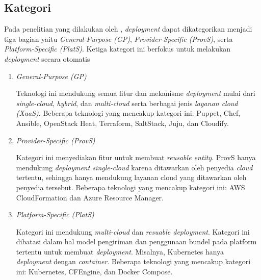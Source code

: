 \subsection{Kategori}
Pada penelitian yang dilakukan oleh \parencite{wurster2020essential}, \textit{deployment} dapat dikategorikan menjadi tiga bagian yaitu \textit{General-Purpose (GP)}, \textit{Provider-Specific (ProvS)}, serta \textit{Platform-Specific (PlatS)}. Ketiga kategori ini berfokus untuk melakukan \textit{deployment} secara otomatis

\begin{enumerate}
  \item \textit{General-Purpose (GP)}

        Teknologi ini mendukung semua fitur dan mekanisme \textit{deployment} mulai dari \textit{single-cloud}, \textit{hybrid}, dan \textit{multi-cloud} serta berbagai jenis \textit{layanan cloud (XaaS)}. Beberapa teknologi yang mencakup kategori ini: Puppet, Chef, Ansible, OpenStack Heat, Terraform, SaltStack, Juju, dan Cloudify.

  \item \textit{Provider-Specific (ProvS)}

        Kategori ini menyediakan fitur untuk membuat \textit{reusable entity}. ProvS hanya mendukung \textit{deployment single-cloud} karena ditawarkan oleh penyedia \textit{cloud} tertentu, sehingga hanya mendukung layanan cloud yang ditawarkan oleh penyedia tersebut. Beberapa teknologi yang mencakup kategori ini: AWS CloudFormation dan Azure Resource Manager.

  \item \textit{Platform-Specific (PlatS)}

        Kategori ini mendukung \textit{multi-cloud} dan \textit{resuable deployment}. Kategori ini dibatasi dalam hal model pengiriman dan penggunaan bundel pada platform tertentu untuk membuat \textit{deployment}. Misalnya, Kubernetes hanya \textit{deployment} dengan \textit{container}. Beberapa teknologi yang mencakup kategori ini: Kubernetes, CFEngine, dan Docker Compose.

\end{enumerate}